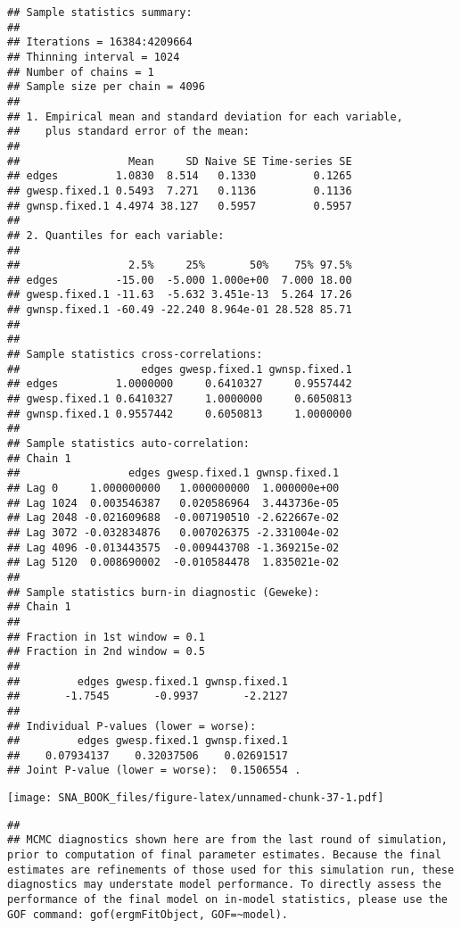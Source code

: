 \documentclass[]{book}
\begin{document}
\begin{verbatim}
## Sample statistics summary:
## 
## Iterations = 16384:4209664
## Thinning interval = 1024 
## Number of chains = 1 
## Sample size per chain = 4096 
## 
## 1. Empirical mean and standard deviation for each variable,
##    plus standard error of the mean:
## 
##                 Mean     SD Naive SE Time-series SE
## edges         1.0830  8.514   0.1330         0.1265
## gwesp.fixed.1 0.5493  7.271   0.1136         0.1136
## gwnsp.fixed.1 4.4974 38.127   0.5957         0.5957
## 
## 2. Quantiles for each variable:
## 
##                 2.5%     25%       50%    75% 97.5%
## edges         -15.00  -5.000 1.000e+00  7.000 18.00
## gwesp.fixed.1 -11.63  -5.632 3.451e-13  5.264 17.26
## gwnsp.fixed.1 -60.49 -22.240 8.964e-01 28.528 85.71
## 
## 
## Sample statistics cross-correlations:
##                   edges gwesp.fixed.1 gwnsp.fixed.1
## edges         1.0000000     0.6410327     0.9557442
## gwesp.fixed.1 0.6410327     1.0000000     0.6050813
## gwnsp.fixed.1 0.9557442     0.6050813     1.0000000
## 
## Sample statistics auto-correlation:
## Chain 1 
##                 edges gwesp.fixed.1 gwnsp.fixed.1
## Lag 0     1.000000000   1.000000000  1.000000e+00
## Lag 1024  0.003546387   0.020586964  3.443736e-05
## Lag 2048 -0.021609688  -0.007190510 -2.622667e-02
## Lag 3072 -0.032834876   0.007026375 -2.331004e-02
## Lag 4096 -0.013443575  -0.009443708 -1.369215e-02
## Lag 5120  0.008690002  -0.010584478  1.835021e-02
## 
## Sample statistics burn-in diagnostic (Geweke):
## Chain 1 
## 
## Fraction in 1st window = 0.1
## Fraction in 2nd window = 0.5 
## 
##         edges gwesp.fixed.1 gwnsp.fixed.1 
##       -1.7545       -0.9937       -2.2127 
## 
## Individual P-values (lower = worse):
##         edges gwesp.fixed.1 gwnsp.fixed.1 
##    0.07934137    0.32037506    0.02691517 
## Joint P-value (lower = worse):  0.1506554 .
\end{verbatim}

\texttt{[image: SNA\_BOOK\_files/figure-latex/unnamed-chunk-37-1.pdf]}

\begin{verbatim}
## 
## MCMC diagnostics shown here are from the last round of simulation, prior to computation of final parameter estimates. Because the final estimates are refinements of those used for this simulation run, these diagnostics may understate model performance. To directly assess the performance of the final model on in-model statistics, please use the GOF command: gof(ergmFitObject, GOF=~model).
\end{verbatim}
\end{document}

